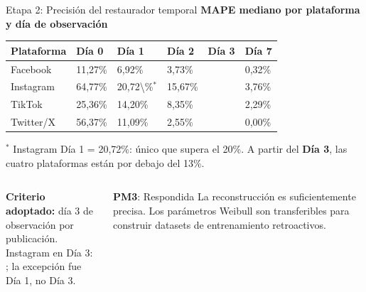 \setcounter{framenumber}{14}
\makered
\begin{frame}{Etapa 2: Precisión del restaurador temporal}
  \textbf{MAPE mediano por plataforma y día de observación}
  \vspace{0.3em}
  \begin{center}
  {\setlength{\tabcolsep}{4pt}
  \scriptsize
  \begin{tabular}{L{2.0cm} C{1.5cm} C{1.5cm} C{1.5cm} C{1.7cm} C{1.5cm}}
    \toprule
    {\color{white}\textbf{Plataforma}} &
    {\color{white}\textbf{Día 0}} &
    {\color{white}\textbf{Día 1}} &
    {\color{white}\textbf{Día 2}} &
    {\color{white}\textbf{Día 3}} &
    {\color{white}\textbf{Día 7}} \\
    \midrule
    Facebook   & 11,27\% & 6,92\% & 3,73\% &   & 0,32\% \\
    Instagram  & 64,77\% & \num{20,72\%}$^*$ & 15,67\% &  & 3,76\% \\
    TikTok     & 25,36\% & 14,20\% & 8,35\% &   & 2,29\% \\
    Twitter/X  & 56,37\% & 11,09\% & 2,55\% &   & 0,00\% \\
    \bottomrule
  \end{tabular}}
  \end{center}

  \vspace{0.2em}
  {\footnotesize $^*$ Instagram Día 1 = 20,72\%: único que supera el 20\%.
  A partir del \textbf{Día 3}, las cuatro plataformas están por debajo del 13\%. \corr{[Corr.\ 1.10]}}

  \vspace{0.3em}
  \begin{columns}[T]
    \begin{column}{0.52\textwidth}
      \textbf{Criterio adoptado:} día 3 de observación por publicación.\\[0.2em]
      Instagram en Día 3: ; la excepción fue Día 1, no Día 3.
    \end{column}
    \begin{column}{0.44\textwidth}
      \begin{exampleblock}{\textbf{PM3}: Respondida}
        \small La reconstrucción es suficientemente precisa.
        Los parámetros Weibull son transferibles para
        construir datasets de entrenamiento retroactivos.
      \end{exampleblock}
    \end{column}
  \end{columns}
\end{frame}
\makeblue

